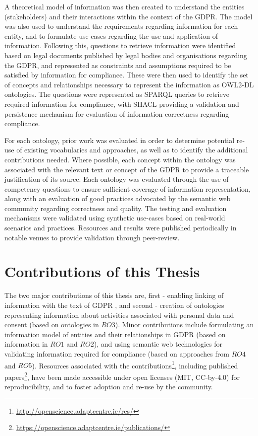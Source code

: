 A theoretical model of information was then created to understand the entities (stakeholders) and their interactions within the context of the GDPR. The model was also used to understand the requirements regarding information for each entity, and to formulate use-cases regarding the use and application of information. Following this, questions to retrieve information were identified based on legal documents published by legal bodies and organisations regarding the GDPR, and represented as constraints and assumptions required to be satisfied by information for compliance. These were then used to identify the set of concepts and relationships necessary to represent the information as OWL2-DL ontologies. The questions were represented as SPARQL queries to retrieve required information for compliance, with SHACL providing a validation and persistence mechanism for evaluation of information correctness regarding compliance.

For each ontology, prior work was evaluated in order to determine potential re-use of existing vocabularies and approaches, as well as to identify the additional contributions needed. Where possible, each concept within the ontology was associated with the relevant text or concept of the GDPR to provide a traceable justification of its source. Each ontology was evaluated through the use of competency questions to ensure sufficient coverage of information representation, along with an evaluation of good practices advocated by the semantic web community regarding correctness and quality. The testing and evaluation mechanisms were validated using synthetic use-cases based on real-world scenarios and practices. Resources and results were published periodically in notable venues to provide validation through peer-review.

\section{Contributions of this Thesis}\label{sec:intro-contributions}
The two major contributions of this thesis are, first - enabling linking of information with the text of GDPR , and second - creation of ontologies representing information about activities associated with personal data and consent (based on ontologies in $RO3$). Minor contributions include formulating an information model of entities and their relationships in GDPR (based on information in $RO1$ and $RO2$), and using semantic web technologies for validating information required for compliance (based on approaches from $RO4$ and $RO5$). Resources associated with the contributions\footnote{\url{http://openscience.adaptcentre.ie/res/}}, including published papers\footnote{\url{https://openscience.adaptcentre.ie/publications/}}, have been made accessible under open licenses (MIT,  CC-by-4.0) for reproducibility, and to foster adoption and re-use by the community.

